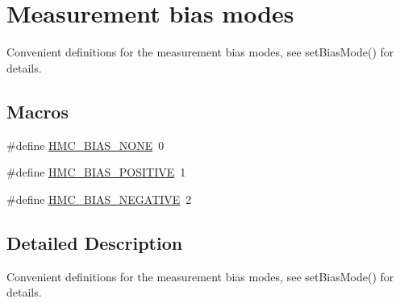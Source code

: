 \hypertarget{group___bias_modes}{\section{Measurement bias modes}
\label{group___bias_modes}
}


Convenient definitions for the measurement bias modes, see {\ttfamily set\+Bias\+Mode()} for details.  


\subsection*{Macros}
\begin{DoxyCompactItemize}
\item 
\#define \hyperlink{group___bias_modes_ga9ae8e2b4da80627c555a1ed3747ebc10}{H\+M\+C\+\_\+\+B\+I\+A\+S\+\_\+\+N\+O\+N\+E}~0
\item 
\#define \hyperlink{group___bias_modes_gaf14afb57269789d0f8d2a1b58bb1a8b4}{H\+M\+C\+\_\+\+B\+I\+A\+S\+\_\+\+P\+O\+S\+I\+T\+I\+V\+E}~1
\item 
\#define \hyperlink{group___bias_modes_ga7698c66ff164b76fbb22630762470d0a}{H\+M\+C\+\_\+\+B\+I\+A\+S\+\_\+\+N\+E\+G\+A\+T\+I\+V\+E}~2
\end{DoxyCompactItemize}


\subsection{Detailed Description}
Convenient definitions for the measurement bias modes, see {\ttfamily set\+Bias\+Mode()} for details. 



